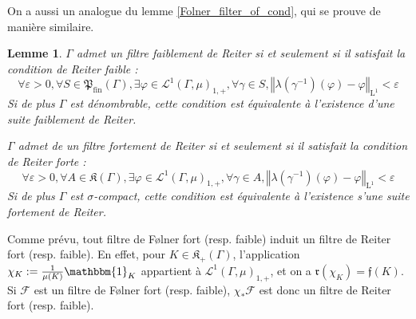 \documentclass[a4paper,12pt]{article}
\newtheorem{lemma}[theorem]{Lemme}
\newtheorem{remark}[theorem]{Remarque}
\newcommand{\norm}[1]{\left\Vert #1\right\Vert}
\newcommand{\indic}{\mathbbm{1}}
\newcommand{\ssi}{si et seulement si }
\newcommand{\inv}{^{-1}}
\newcommand{\finparts}{\mathfrak{P}_{\mathrm{fin}}}
\begin{document}
On a aussi un analogue du lemme \ref{Folner_filter_of_cond}, qui se prouve de manière similaire.

\begin{lemma}\label{Reiter_filter_of_cond}
    $\Gamma$ admet un filtre faiblement de Reiter \ssi il satisfait la 
    \emph{condition de Reiter faible} :
    \begin{equation}\label{weak_Reiter_cond}\tag{WR}
        \forall\varepsilon>0, \forall S\in\finparts(\Gamma), \exists \varphi\in\mathscr{L}^1(\Gamma, \mu)_{1,+}, \forall \gamma\in S,
        \norm{\lambda(\gamma\inv)(\varphi)-\varphi}_{\mathrm{L}^1}<\varepsilon
    \end{equation}
    Si de plus $\Gamma$ est dénombrable, cette condition est équivalente à l'existence d'une \emph{suite} faiblement de Reiter.

    $\Gamma$ admet de un filtre fortement de Reiter \ssi il satisfait la \emph{condition de Reiter forte} : 
    \begin{equation}\label{strong_Reiter_cond}\tag{SR}
        \forall\varepsilon>0, \forall A\in\mathfrak{K}(\Gamma), \exists\varphi\in\mathscr{L}^1(\Gamma, \mu)_{1,+}, \forall\gamma\in A, 
        \norm{\lambda(\gamma\inv)(\varphi)-\varphi}_{\mathrm{L}^1}<\varepsilon
    \end{equation}
    Si de plus $\Gamma$ est $\sigma$-compact, cette condition est équivalente à l'existence s'une \emph{suite} fortement de Reiter.
\end{lemma}

Comme prévu, tout filtre de F\o{}lner fort (resp. faible) induit un filtre de Reiter fort (resp. faible). En effet, pour $K\in\mathfrak{K}_+(\Gamma)$, l'application 
$\chi_K:=\frac1{\mu(K)}\indic_K$ appartient à $\mathscr{L}^1(\Gamma, \mu)_{1,+}$, et on a $\mathfrak{r}(\chi_K) = \mathfrak{f}(K)$.
Si $\mathscr{F}$ est un filtre de F\o{}lner fort (resp. faible), $\chi_*\mathscr{F}$ est donc un filtre de Reiter fort (resp. faible).

\end{document}
